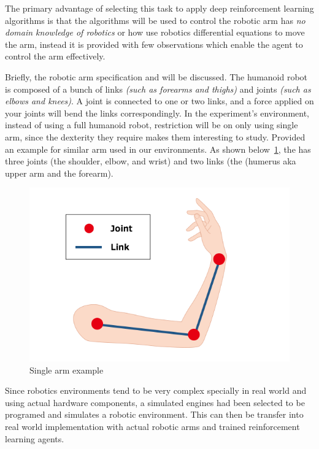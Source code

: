 The primary advantage of selecting this task to apply deep reinforcement learning algorithms is that the algorithms will be used to control the robotic arm has \textit{no domain knowledge of robotics} or how use robotics differential equations to move the arm, instead it is provided with few observations which enable the agent to control the arm effectively. 

Briefly, the robotic arm specification and will be discussed. The humanoid robot is composed of a bunch of links \textit{(such as forearms and thighs)} and joints \textit{ (such as elbows and knees)}. A joint is connected to one or two links, and a force applied on your joints will bend the links correspondingly. In the experiment's environment, instead of using a full humanoid robot, restriction will be on only using single arm, since the dexterity they require makes them interesting to study. 
Provided an example for similar arm used in our environments. As shown below~\ref{fig:arm}, the has three joints (the shoulder, elbow, and wrist) and two links (the (humerus aka upper arm and the forearm).

\begin{figure}[!htb]
		\centering
		\includegraphics[width=\linewidth]{figures/arm.png}
		\caption{Single arm example}
		\label{fig:arm}
\end{figure}

Since robotics environments tend to be very complex specially in real world and using actual hardware components, a simulated engines had been selected to be programed and simulates a robotic environment. This can then be transfer into real world implementation with actual robotic arms and trained reinforcement learning agents. 

